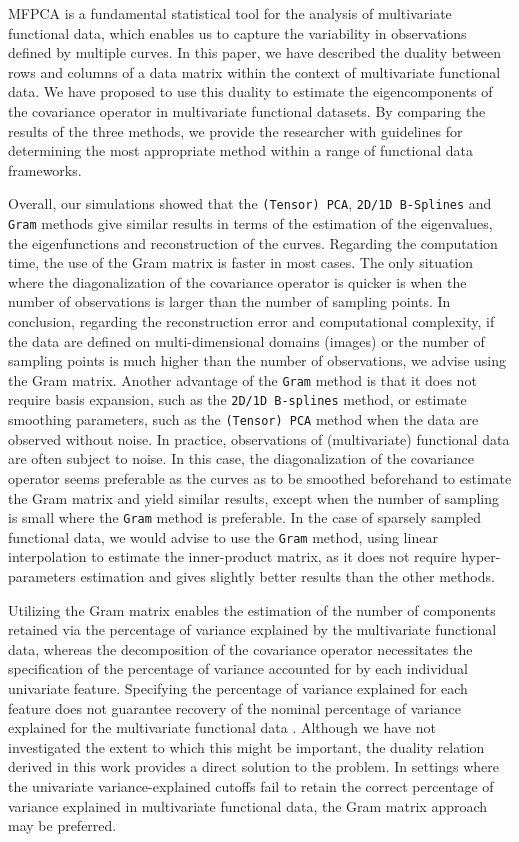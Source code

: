 \documentclass[times,sort&compress,3p]{elsarticle}
\theoremstyle{plain}%
\theoremstyle{definition}
\begin{document}
MFPCA is a fundamental statistical tool for the analysis of multivariate functional data, which enables us to capture the variability in observations defined by multiple curves. In this paper, we have described the duality between rows and columns of a data matrix within the context of multivariate functional data. We have proposed to use this duality to estimate the eigencomponents of the covariance operator in multivariate functional datasets. By comparing the results of the three methods, we provide the researcher with guidelines for determining the most appropriate method within a range of functional data frameworks. 

Overall, our simulations showed that the \texttt{(Tensor) PCA}, \texttt{2D/1D B-Splines} and \texttt{Gram} methods give similar results in terms of the estimation of the eigenvalues, the eigenfunctions and reconstruction of the curves. Regarding the computation time, the use of the Gram matrix is faster in most cases. The only situation where the diagonalization of the covariance operator is quicker is when the number of observations is larger than the number of sampling points.
In conclusion, regarding the reconstruction error and computational complexity, if the data are defined on multi-dimensional domains (images) or the number of sampling points is much higher than the number of observations, we advise using the Gram matrix. Another advantage of the \texttt{Gram} method is that it does not require basis expansion, such as the \texttt{2D/1D B-splines} method, or estimate smoothing parameters, such as the \texttt{(Tensor) PCA} method when the data are observed without noise. In practice, observations of (multivariate) functional data are often subject to noise. In this case, the diagonalization of the covariance operator seems preferable as the curves as to be smoothed beforehand to estimate the Gram matrix and yield similar results, except when the number of sampling is small where the \texttt{Gram} method is preferable. In the case of sparsely sampled functional data, we would advise to use the \texttt{Gram} method, using linear interpolation to estimate the inner-product matrix, as it does not require hyper-parameters estimation and gives slightly better results than the other methods.

Utilizing the Gram matrix enables the estimation of the number of components retained via the percentage of variance explained by the multivariate functional data, whereas the decomposition of the covariance operator necessitates the specification of the percentage of variance accounted for by each individual univariate feature. Specifying the percentage of variance explained for each feature does not guarantee recovery of the nominal percentage of variance explained for the multivariate functional data \citep{golovkineEstimationNumberComponents2023}. Although we have not investigated the extent to which this might be important, the duality relation derived in this work provides a direct solution to the problem. In settings where the univariate variance-explained cutoffs fail to retain the correct percentage of variance explained in multivariate functional data, the Gram matrix approach may be preferred.
\end{document}
